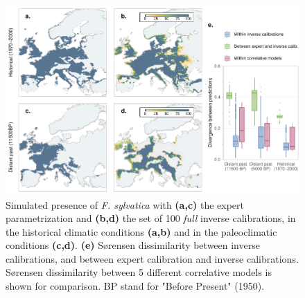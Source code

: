 \begin{figure}[htpb]
\centering
\begin{subcaptiongroup}
\label{fig:1A} 
\label{fig:1B}
\label{fig:1C}
\label{fig:1D}
\label{fig:1E}
\end{subcaptiongroup}
\includegraphics{chapter3/figs/fig1-1.pdf}
\caption{Simulated presence of \emph{F. sylvatica} with \textbf{(a,c)} the expert parametrization and \textbf{(b,d)} the set of 100 \emph{full} inverse calibrations, in the historical climatic conditions \textbf{(a,b)} and in the paleoclimatic conditions \textbf{(c,d)}. \textbf{(e)} S\o rensen dissimilarity between inverse calibrations, and between expert calibration and inverse calibrations. S\o rensen dissimilarity between 5 different correlative models is shown for comparison. BP stand for "Before Present" (1950).}
\label{fig:1}
\end{figure}

